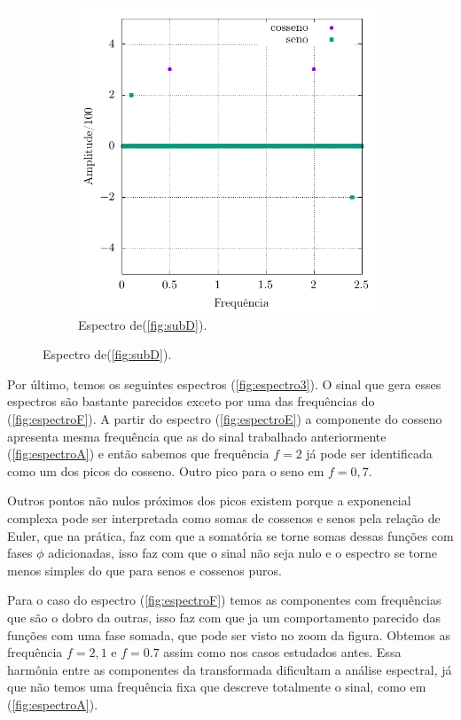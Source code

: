 \documentclass[a4paper, 11pt]{article}
\begin{document}
\begin{figure}[h!]
\begin{subfigure}{0.45\textwidth}
        \includegraphics[width=\textwidth]{output-dft-D}
        \caption{Espectro de(\ref{fig:subD}).}
        \label{fig:espectroD}
    \end{subfigure}
   \label{fig:espectro2}
\end{figure} 


Por último, temos os seguintes espectros (\ref{fig:espectro3}). O sinal que gera esses espectros
são bastante parecidos exceto por uma das frequências do (\ref{fig:espectroF}). A partir do
espectro (\ref{fig:espectroE}) a componente do cosseno apresenta mesma frequência que as do sinal
trabalhado anteriormente (\ref{fig:espectroA}) e então sabemos que frequência \( f = 2 \) já pode
ser identificada como um dos picos do cosseno. Outro pico para o seno em \( f = 0,7 \).


Outros pontos não nulos próximos dos picos existem porque a exponencial complexa pode ser interpretada como
somas de cossenos e senos pela relação de Euler, que na prática, faz com que a somatória se torne
somas dessas funções com fases \( \phi \) adicionadas, isso faz com que o sinal não seja nulo e o
espectro se torne menos simples do que para senos e cossenos puros. 

Para o caso do espectro (\ref{fig:espectroF}) temos as componentes com frequências que são o dobro
da outras, isso faz com que ja um comportamento parecido das funções com uma fase somada, que pode
ser visto no zoom da figura. Obtemos as frequência \( f = 2,1\) e \( f = 0.7 \) assim como nos casos
estudados antes. Essa harmônia entre as componentes da transformada dificultam a análise espectral,
já que não temos uma frequência fixa que descreve totalmente o sinal, como em
(\ref{fig:espectroA}).
\end{document}
